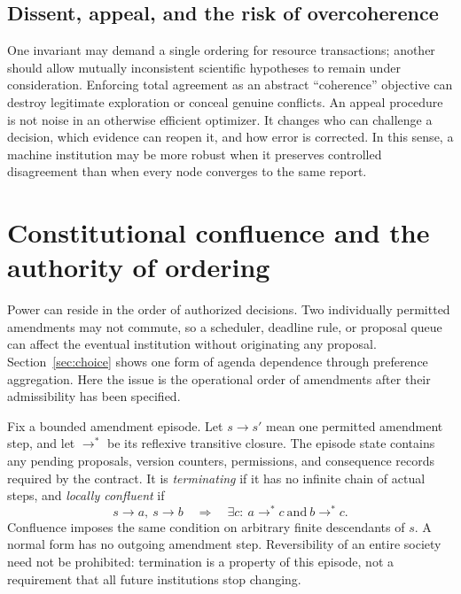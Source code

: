 \documentclass[11pt,letterpaper]{article}
\theoremstyle{plain}
\theoremstyle{definition}
\theoremstyle{remark}
\begin{document}
\subsection{Dissent, appeal, and the risk of overcoherence}

One invariant may demand a single ordering for resource transactions; another should allow mutually inconsistent scientific hypotheses to remain under consideration. Enforcing total agreement as an abstract ``coherence'' objective can destroy legitimate exploration or conceal genuine conflicts. An appeal procedure is not noise in an otherwise efficient optimizer. It changes who can challenge a decision, which evidence can reopen it, and how error is corrected. In this sense, a machine institution may be more robust when it preserves controlled disagreement than when every node converges to the same report.


\section{Constitutional confluence and the authority of ordering}\label{sec:confluence}
Power can reside in the order of authorized decisions. Two individually permitted amendments may not commute, so a scheduler, deadline rule, or proposal queue can affect the eventual institution without originating any proposal. Section~\ref{sec:choice} shows one form of agenda dependence through preference aggregation. Here the issue is the operational order of amendments after their admissibility has been specified.

Fix a bounded amendment episode. Let $s\to s'$ mean one permitted amendment step, and let $\to^*$ be its reflexive transitive closure. The episode state contains any pending proposals, version counters, permissions, and consequence records required by the contract. It is \emph{terminating} if it has no infinite chain of actual steps, and \emph{locally confluent} if
\[
s\to a,\ s\to b\quad\Longrightarrow\quad
\exists c:\ a\to^*c\ \text{and}\ b\to^*c.
\]
Confluence imposes the same condition on arbitrary finite descendants of $s$. A normal form has no outgoing amendment step. Reversibility of an entire society need not be prohibited: termination is a property of this episode, not a requirement that all future institutions stop changing.
\end{document}
